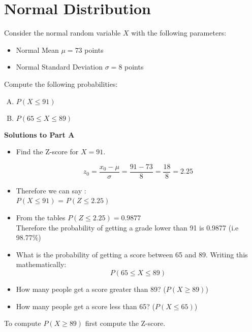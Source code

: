 \documentclass[a4paper,12pt]{article}
\begin{document}
	
	



\section*{Normal Distribution}

Consider the normal random variable $X$ with the following parameters:
\begin{itemize}
	\item Normal Mean $\mu = 73$ points
	\item Normal Standard Deviation $\sigma = 8$ points
\end{itemize}
Compute the following probabilities:
\begin{enumerate}[(A)]
	\item $P(X \leq 91)$
	\item $P(65 \leq X \leq 89)$
\end{enumerate}

\noindent \textbf{Solutions to Part A}
\begin{itemize}
	\item Find the Z-score for $X = 91$.
	
	\[ z_0 = \frac{x_0- \mu}{ \sigma} = \frac{91 - 73}{8} =\frac{18}{8} = 2.25\]
	\item Therefore we can say :\\ $P(X \leq 91)$ = $P(Z \leq 2.25)$ \\
	
	
	\item From the tables $P(Z \leq 2.25) = 0.9877$\\
	Therefore the probability of getting a grade lower than 91 is 0.9877 (i.e 98.77\%)
	
	
	\item What is the probability of getting a score between 65 and 89.
	Writing this mathematically:
	\[ P(65 \leq X \leq 89) \]
\end{itemize}

	
	
	
	\begin{itemize}
		\item How many people get a score greater than 89? ($P(X\geq 89)$)
		\item How many people get a score less than 65? ($P(X\leq 65)$)
	\end{itemize}
	
	To compute $P(X \geq 89)$ first compute the Z-score.
	
\end{document}
